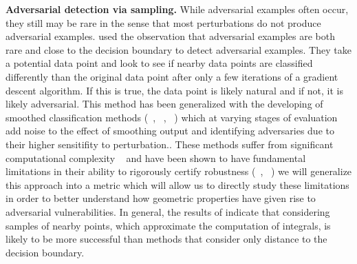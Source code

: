 
{\bf Adversarial detection via sampling.}
While adversarial examples often occur, they still may be rare in the sense that most perturbations do not produce adversarial examples. \citet{yu2019new} used the observation that adversarial examples are both rare and close to the decision boundary to detect adversarial examples. They take a potential data point and look to see if nearby data points are classified differently than the original data point after only a few iterations of a gradient descent algorithm. If this is true, the data point is likely natural and if not, it is likely adversarial. This method has been generalized with the developing of smoothed classification methods (~\cite{cohen2019certified}, ~\cite{lecuyer2019certified}, ~\cite{li2019certified}) which at varying stages of evaluation add noise to the effect of smoothing output and identifying adversaries due to their higher sensitifity to perturbation.. These methods suffer from significant computational complexity ~\cite{kumar2020curse} and have been shown to have fundamental limitations in their ability to rigorously certify robustness (~\cite{blum2020random}, ~\cite{yang2020randomized}) we will generalize this approach into a metric which will allow us to directly study these limitations in order to better understand how geometric properties have given rise to adversarial vulnerabilities. In general, the results of \citet{yu2019new} indicate that considering samples of nearby points, which approximate the computation of integrals, is likely to be more successful than methods that consider only distance to the decision boundary.

